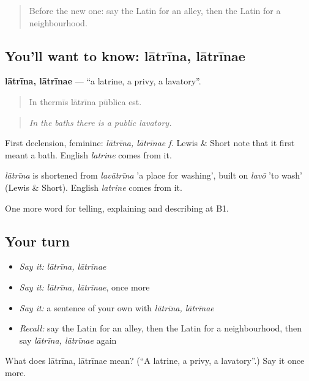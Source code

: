 \begin{quote}
Before the new one: say the Latin for an alley, then the Latin for a neighbourhood.
\end{quote}

\subsection*{You'll want to know: lātrīna, lātrīnae}
\textbf{lātrīna, lātrīnae} — \textquotedblleft{}a latrine, a privy, a lavatory\textquotedblright{}.

\begin{quote}
In thermīs lātrīna pūblica est.
\end{quote}

\begin{quote}
\emph{In the baths there is a public lavatory.}
\end{quote}

First declension, feminine: \emph{lātrīna, lātrīnae f.} Lewis \& Short note that it first meant a bath. English \emph{latrine} comes from it.

\begin{cousinweb}
\emph{lātrīna} is shortened from \emph{lavātrīna} 'a place for washing', built on \emph{lavō} 'to wash' (Lewis \& Short). English \emph{latrine} comes from it.
\end{cousinweb}

\begin{grammarlens}[title={What you've built}]
One more word for telling, explaining and describing at B1.
\end{grammarlens}

\subsection*{Your turn}
\begin{itemize}
\raggedright
  \item \emph{Say it:} \emph{lātrīna, lātrīnae}
  \item \emph{Say it:} \emph{lātrīna, lātrīnae}, once more
  \item \emph{Say it:} a sentence of your own with \emph{lātrīna, lātrīnae}
  \item \emph{Recall:} say the Latin for an alley, then the Latin for a neighbourhood, then say \emph{lātrīna, lātrīnae} again
\end{itemize}

\begin{tcolorbox}[breakable,colback=teal!4,colframe=teal!35!black,title={Before you move on}]
What does lātrīna, lātrīnae mean? (\textquotedblleft{}A latrine, a privy, a lavatory\textquotedblright{}.) Say it once more.
\end{tcolorbox}
